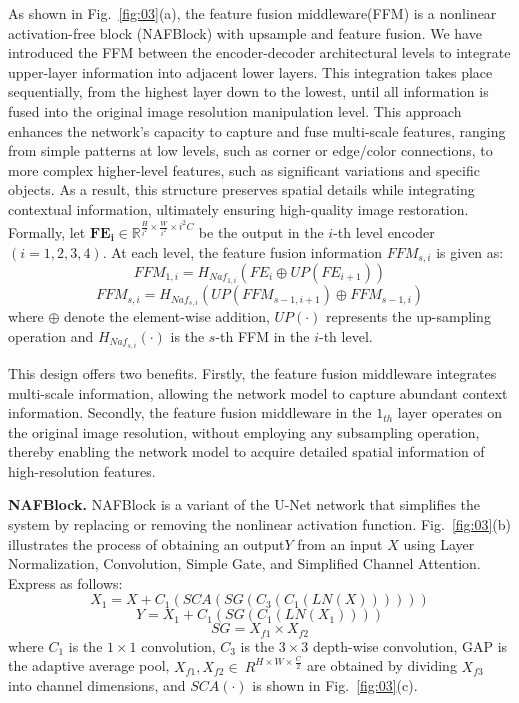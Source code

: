 \documentclass[sn-mathphys,Numbered]{sn-jnl}
\theoremstyle{thmstyleone}\newtheorem{theorem}{Theorem}\newtheorem{proposition}[theorem]{Proposition}
\theoremstyle{thmstyletwo}\newtheorem{example}{Example}\newtheorem{remark}{Remark}
\theoremstyle{thmstylethree}\newtheorem{definition}{Definition}
\begin{document}
As shown in Fig.~\ref{fig:03}(a), the feature fusion middleware(FFM) is a  nonlinear activation-free block (NAFBlock) with upsample and feature fusion. We have introduced the FFM between the encoder-decoder architectural levels to integrate upper-layer information into adjacent lower layers. This integration takes place sequentially, from the highest layer down to the lowest, until all information is fused into the original image resolution manipulation level. This approach enhances the network's capacity to capture and fuse multi-scale features, ranging from simple patterns at low levels, such as corner or edge/color connections, to more complex higher-level features, such as significant variations and specific objects. As a result, this structure preserves spatial details while integrating contextual information, ultimately ensuring high-quality image restoration. Formally, let  $\mathbf{FE_i} \in \mathbb R^{\frac{H}{i^2} \times \frac{W}{i^2} \times {i^2}C}$ be the output in the $i$-th level encoder $(i=1,2,3,4)$. At each level, the feature fusion information $FFM_{s,i}$ is given as:
\begin{equation}
	\label{equ:02}
	FFM_{1,i} =  H_{Naf_{1,i}}( FE_{i} \oplus UP(FE_{i+1}))
\end{equation}
\begin{equation}
	\label{equ:03}
	FFM_{s,i} =   H_{Naf_{s,i}}(UP(FFM_{s-1,i+1}) \oplus FFM_{s-1,i})
\end{equation}
where $\oplus$ denote the element-wise addition, $UP(\cdot)$ represents the up-sampling operation and $H_{Naf_{s,i}}(\cdot)$ is the $s$-th FFM in the $i$-th level. 

This design offers two benefits. Firstly, the feature fusion middleware integrates multi-scale information, allowing the network model to capture abundant context information. Secondly, the feature fusion middleware in the $1_{th}$ layer operates on the original image resolution, without employing any subsampling operation, thereby enabling the network model to acquire detailed spatial information of high-resolution features.

\noindent\textbf{NAFBlock.} NAFBlock is a variant of the U-Net network that simplifies the system by replacing or removing the nonlinear activation function. Fig.~\ref{fig:03}(b) illustrates the process of obtaining an output$Y$ from an input $X$ using Layer Normalization, Convolution, Simple Gate, and Simplified Channel Attention. Express as follows:
\begin{equation}
	\label{equ:04}
	X_1 = X + C_1(SCA(SG(C_3(C_1(LN(X))))))
\end{equation}
\begin{equation}
	\label{equ:05}
    Y = X_1 + C_1(SG(C_1(LN(X_1))))
\end{equation}
\begin{equation}
	\label{equ:06}
 SG = X_{f1} \times X_{f2}
\end{equation}
where $C_1$ is the $1 \times 1$ convolution, $C_3$ is the $3 \times 3$ depth-wise convolution, GAP is the adaptive average pool, $X_{f1}, X_{f2} \in \  R^{H \times W \times \frac{C}{2}}$ are obtained by dividing $X_{f3}$ into channel dimensions, and $SCA(\cdot)$ is shown in Fig.~\ref{fig:03}(c).
\end{document}
